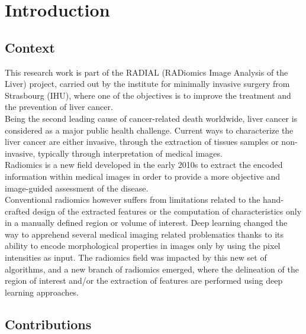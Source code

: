 \chapter*[Introduction]{Introduction}
\label{cha:Introduction}

\section*{Context}
\label{sec:Context}

This research work is part of the RADIAL (RADiomics Image Analysis of the Liver) project, carried out by the
institute for minimally invasive surgery from Strasbourg (IHU), where
one of the objectives is to improve the treatment and the prevention of
liver cancer.\\
Being the second leading cause of cancer-related death worldwide, liver
cancer is considered as a major public health challenge. Current ways to characterize the liver cancer are either invasive, 
through the extraction of tissues samples or non-invasive, typically 
through interpretation of medical images.\\
Radiomics is a new field developed in the early 2010s to extract the encoded information within medical images in order to provide a more objective and image-guided assessment of the disease.\\
Conventional radiomics however suffers from limitations related to the hand-crafted design of the extracted features or the computation of characteristics only in a manually defined region or volume of interest. Deep learning changed the way to apprehend several medical imaging related problematics thanks to its ability to encode
morphological properties in images only by using the pixel intensities
as input. The radiomics field was impacted by this new set of algorithms, and a new branch of radiomics emerged, where the delineation of the region of interest and/or the extraction of features are performed using deep learning approaches.

\section*{Contributions}
\label{sec:IntroContributions}

